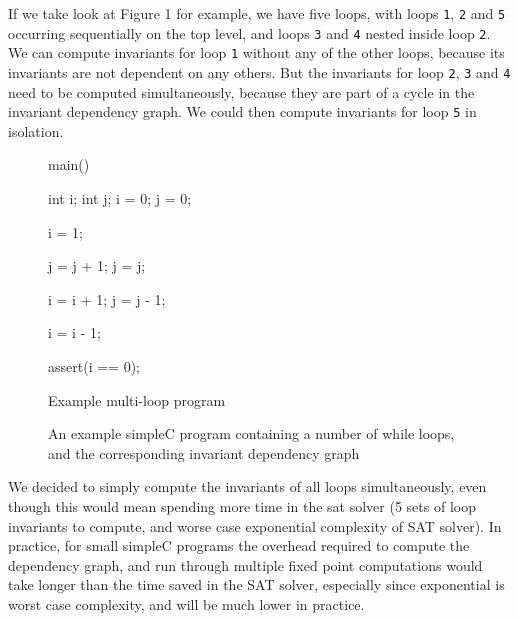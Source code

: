 \documentclass[11pt]{article}
\begin{document}
If we take look at Figure 1 for example, we have five loops, with loops \verb|1|, \verb|2| and \verb|5| occurring sequentially on the top level, and loops \verb|3| and \verb|4| nested inside loop \verb|2|. We can compute invariants for loop \verb|1| without any of the other loops, because its invariants are not dependent on any others. But the invariants for loop \verb|2|, \verb|3| and \verb|4| need to be computed simultaneously, because they are part of a cycle in the invariant dependency graph. We could then compute invariants for loop \verb|5| in isolation. \\

\begin{figure}[H]
\begin{center}
  \begin{minipage}[b]{.4\textwidth}
    \begin{algorithm}[H]
    main() {

    int i;
    int j;
    i = 0;
    j = 0;

     {
        i = 1;
    }

    {
       {
            j = j + 1;
        }
        j = j;

         {
            i = i + 1;
            j = j - 1;
        }
    }

     {
        i = i - 1;
    }

    assert(i == 0);
    }
    \caption{Example multi-loop program}
    \end{algorithm}
  \end{minipage}
  \quad \quad \quad \quad \quad \quad \quad \quad
  \begin{minipage}[H]{.3\textwidth}
    
  \end{minipage}
\end{center}
\caption{An example simpleC program containing a number of while loops, and the corresponding invariant dependency graph}
\end{figure}

We decided to simply compute the invariants of all loops simultaneously, even though this would mean spending more time in the sat solver (5 sets of loop invariants to compute, and worse case exponential complexity of SAT solver). In practice, for small simpleC programs the overhead required to compute the dependency graph, and run through multiple fixed point computations would take longer than the time saved in the SAT solver, especially since exponential is worst case complexity, and will be much lower in practice. \\
\end{document}
